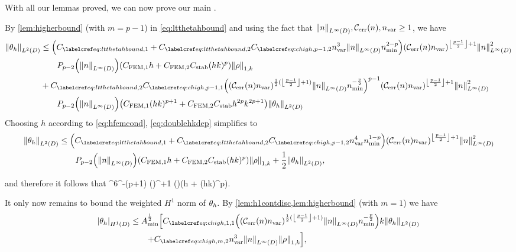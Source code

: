 \epf
With all our lemmas proved, we can now prove our main .

\label{page:thmfembound}
By \cref{lem:higherbound} (with $m=p-1$) in \cref{eq:ltthetahbound} and using the fact that $\NLiD{n}, \En, \nvar \geq 1$, we have
\begin{align}
\NLtD{\thetah}&\leq \mleft(\Cfirst + \Csecond\Chighfn{p-1,2} \nvar^3\NLiD{n}\nmin^{2-p} \mright)\mleft(\En \nvar\mright)^{\floor{\frac{p-1}2}+1}\NLiD{n}^2\nonumber\\
&\quad\quad\Pfn{p-2}\mleft(\NLiD{n}\mright)\mleft(\CFEMotilde h + \CFEMttilde \CAnk (hk)^p\mright)\NW{\rho}\nonumber\\
&+\Csecond  \Chighfn{p-1,1} \mleft(\mleft(\En\nvar\mright)^{\half(\floor{\frac{p-1}2}+1)}\NLiD{n}\nmin^{-\frac{p}2}\mright)^{p-1}\mleft(\En \nvar\mright)^{\floor{\frac{p-1}2}+1}\NLiD{n}^2\nonumber\\
&\quad\quad\Pfn{p-2}\mleft(\NLiD{n}\mright)\mleft(\CFEMotilde (hk )^{p+1}+ \CFEMttilde \CAnk h^{2p}k^{2p+1}\mright)\NLtD{\thetah}\label{eq:doublehkdep}
\end{align}
Choosing $h$ according to \cref{eq:hfemcond}, \cref{eq:doublehkdep} simplifies to
\begin{align*}
\NLtD{\thetah} &\leq \mleft(\Cfirst + \Csecond\Chighfn{p-1,2} \nvar^4\nmin^{1-p} \mright)\mleft(\En \nvar\mright)^{\floor{\frac{p-1}2}+1}\NLiD{n}^2\\
&\quad\quad\Pfn{p-2}\mleft(\NLiD{n}\mright)\mleft(\CFEMotilde h + \CFEMttilde \CAnk (hk)^p\mright)\NW{\rho} + \half \NLtD{\thetah},
\end{align*}

and therefore it follows that
\beq\label{eq:ltboundwithrho}
\NLtD{\thetah} \leq \nvar^6\nmin^{-(p+1)} \mleft(\En \nvar\mright)^{+1} \mleft(\mright)\mleft(\CLtboundo h + \CLtboundt  \CAnk (hk)^p\mright)\NW{\rho}.
\eeq

It only now remains to bound the weighted $H^1$ norm of $\theta_{h}.$ By \cref{lem:h1contdisc,lem:higherbound} (with $m=1$) we have
\begin{align}
\SNHoD{\thetah} &\leq \Amin^{\half} \mleft[\Chighfn{1,1} \mleft(\mleft(\En\nvar\mright)^{\half(\floor{\frac{p-1}2}+1)}\NLiD{n}\nmin^{-\frac{p}2}\mright)k \NLtD{\thetah}\mright.\nonumber\\
&\mleft.\quad\quad+ \Chighmt \nvar^3\NLiD{n} \NW{\rho}\mright],\label{eq:sntheta}
\end{align}

